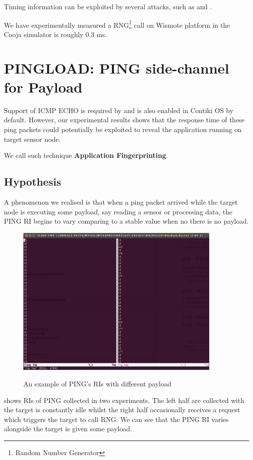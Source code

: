 Timing information can be exploited by several attacks, such as \cite{Peekaboo} and \cite{rsatiming}.

We have experimentally measured a RNG\footnote{Random Number Generator} call on Wismote platform in the Cooja simulator is roughly 0.3 ms.

\section{PINGLOAD: PING side-channel for Payload }
Support of ICMP ECHO is required by \cite{rfc1122} and is also enabled in Contiki OS by default. However, our experimental results shows that the response time of these ping packets could potentially be exploited to reveal the application running on target sensor node.

We call such technique {\bf  Application Fingerprinting}.

\subsection{Hypothesis}
A phenomenon we realised is that when a ping packet arrived while the target node is executing some payload, say reading a sensor or processing data, the PING RI begins to vary comparing to a stable value  when no there is no payload. 

\begin{example}
\begin{figure}
\centering
{
  \includegraphics[width=0.9\textwidth]{fig/pingri.png}
}
\caption{An example of PING’s RIs with different payload}
\label{Fig: PINGLOAD RIs}
\end{figure}
 shows RIs of PING collected in two experiments. The left half are collected with the target is constantly idle whilst the right half occasionally receives a request which triggers the target to call RNG. We can see that the PING RI varies alongside the target is given some payload.
\end{example}

